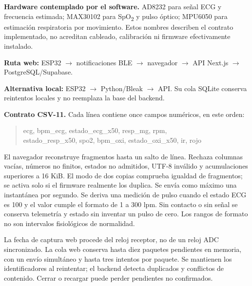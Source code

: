 \newpage
{}
\textbf{Hardware contemplado por el software.} AD8232 para señal ECG y frecuencia estimada; MAX30102 para SpO\textsubscript{2} y pulso óptico; MPU6050 para estimación respiratoria por movimiento. Estos nombres describen el contrato implementado, no acreditan cableado, calibración ni firmware efectivamente instalado.
\begin{infobox}
\textbf{Ruta web:} ESP32 $\rightarrow$ notificaciones BLE $\rightarrow$ navegador $\rightarrow$ API Next.js $\rightarrow$ PostgreSQL/Supabase.\par
\textbf{Alternativa local:} ESP32 $\rightarrow$ Python/Bleak $\rightarrow$ API. Su cola SQLite conserva reintentos locales y no reemplaza la base del backend.
\end{infobox}
\textbf{Contrato CSV-11.} Cada línea contiene once campos numéricos, en este orden:
\begin{quote}\small\ttfamily ecg, bpm\_ecg, estado\_ecg\_x50, resp\_mg, rpm,\\ estado\_resp\_x50, spo2, bpm\_oxi, estado\_oxi\_x50, ir, rojo\end{quote}
El navegador reconstruye fragmentos hasta un salto de línea. Rechaza columnas vacías, números no finitos, estados no admitidos, UTF-8 inválido y acumulaciones superiores a 16 KiB. El modo de dos copias comprueba igualdad de fragmentos; se activa solo si el firmware realmente los duplica.
Se envía como máximo una instantánea por segundo. Se deriva una medición de pulso cuando el estado ECG es 100 y el valor cumple el formato de 1 a 300 lpm. Sin contacto o sin señal se conserva telemetría y estado sin inventar un pulso de cero. Los rangos de formato no son intervalos fisiológicos de normalidad.

La fecha de captura web procede del reloj receptor, no de un reloj ADC sincronizado. La cola web conserva hasta diez paquetes pendientes en memoria, con un envío simultáneo y hasta tres intentos por paquete. Se mantienen los identificadores al reintentar; el backend detecta duplicados y conflictos de contenido. Cerrar o recargar puede perder pendientes no confirmados.

